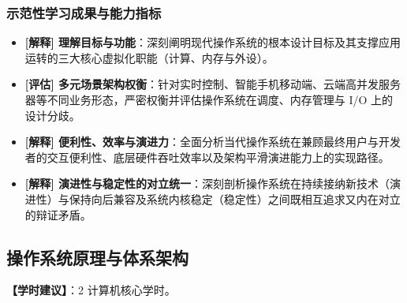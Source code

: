 \subsubsection{示范性学习成果与能力指标}
\begin{itemize}\setlength{\itemsep}{0pt}\setlength{\parskip}{0pt}
    \item \textbf{[解释] 理解目标与功能}：深刻阐明现代操作系统的根本设计目标及其支撑应用运转的三大核心虚拟化职能（计算、内存与外设）。
    \item \textbf{[评估] 多元场景架构权衡}：针对实时控制、智能手机移动端、云端高并发服务器等不同业务形态，严密权衡并评估操作系统在调度、内存管理与 I/O 上的设计分歧。
    \item \textbf{[解释] 便利性、效率与演进力}：全面分析当代操作系统在兼顾最终用户与开发者的交互便利性、底层硬件吞吐效率以及架构平滑演进能力上的实现路径。
    \item \textbf{[解释] 演进性与稳定性的对立统一}：深刻剖析操作系统在持续接纳新技术（演进性）与保持向后兼容及系统内核稳定（稳定性）之间既相互追求又内在对立的辩证矛盾。
\end{itemize}

\subsection{操作系统原理与体系架构}
\textbf{【学时建议】}：2 计算机核心学时。

